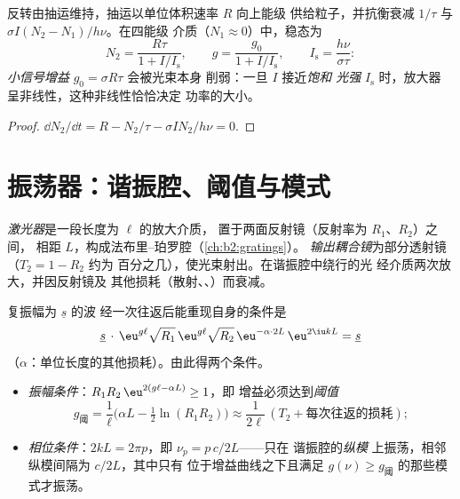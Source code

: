 \begin{proposition}[增益的饱和]\label{prop:b2:laser:saturation}
反转由抽运维持，抽运以单位体积速率 $R$ 向上能级
供给粒子，并抗衡衰减 $1/\tau$ 与
 $\sigma I (N_2 - N_1)/h\nu$。在四能级
介质（$N_1 \approx 0$）中，稳态为
\[
N_2 = \frac{R\tau}{1 + I/I_{\text{s}}}, \qquad
g = \frac{g_0}{1 + I/I_{\text{s}}}, \qquad
I_{\text{s}} = \frac{h\nu}{\sigma\tau} :
\]
\emph{小信号增益} $g_0 = \sigma R\tau$ 会被光束本身
削弱：一旦 $I$ 接近\emph{饱和
光强} $I_{\text{s}}$ 时，放大器
呈非线性，这种非线性恰恰决定
功率的大小。
\end{proposition}

\begin{proof}
$\dd N_2/\dd t = R - N_2/\tau - \sigma I N_2/h\nu = 0$.
\end{proof}

\section{振荡器：谐振腔、阈值与模式}

\begin{definition}[激光谐振腔]\label{def:b2:laser:cavity}
\emph{激光器}是一段长度为 $\ell$ 的放大介质，
置于两面反射镜（反射率为 $R_1$、$R_2$）之间，
相距 $L$，构成法布里–珀罗腔（\cref{ch:b2:gratings}）。
\emph{输出耦合镜}为部分透射镜（$T_2 = 1 - R_2$ 约为
百分之几），使光束射出。在谐振腔中绕行的光
经介质两次放大，并因反射镜及
其他损耗（散射、、）而衰减。
\end{definition}

\begin{theorem}[振荡条件]\label{thm:b2:laser:threshold}
复振幅为 $\underline s$ 的波
经一次往返后能重现自身的条件是
\[
\underline s\,\cdot\, \eu^{g\ell}\sqrt{R_1}\,\eu^{g\ell}\sqrt{R_2}\,
\eu^{-\alpha\cdot 2L}\,\eu^{2\iu kL} = \underline s
\]
（$\alpha$：单位长度的其他损耗）。由此得两个条件。
\begin{itemize}
\item \emph{振幅条件}：$R_1R_2\,\eu^{2(g\ell - \alpha L)} \ge 1$，即
      增益必须达到\emph{阈值}
      \[
      g_{\text{阈}} = \frac{1}{\ell}\Big(\alpha L - \tfrac12\ln(R_1R_2)\Big)
      \approx \frac{1}{2\ell}\,(T_2 + \text{每次往返的损耗}) ;
      \]
\item \emph{相位条件}：$2kL = 2\pi p$，即 $\nu_p = p\,c/2L$——只在
      谐振腔的\emph{纵模}
上振荡，相邻纵模间隔为 $c/2L$，其中只有
      位于增益曲线之下且满足 $g(\nu) \ge g_{\text{阈}}$ 的那些模式才振荡。
\end{itemize}
\end{theorem}

